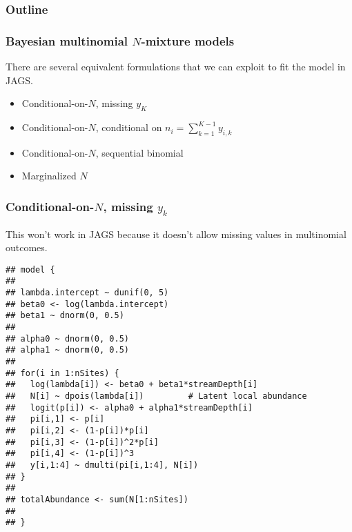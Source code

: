 \documentclass[color=usenames,dvipsnames]{beamer}\usepackage[]{graphicx}\usepackage[]{color}
\makeatletter
\newenvironment{kframe}{%
 \def\at@end@of@kframe{}%
 \ifinner\ifhmode%
  \def\at@end@of@kframe{\end{minipage}}%
  \begin{minipage}{\columnwidth}%
 \fi\fi%
 \def\FrameCommand##1{\hskip\@totalleftmargin \hskip-\fboxsep
 \colorbox{shadecolor}{##1}\hskip-\fboxsep
     \hskip-\linewidth \hskip-\@totalleftmargin \hskip\columnwidth}%
 \MakeFramed {\advance\hsize-\width
   \@totalleftmargin\z@ \linewidth\hsize
   \@setminipage}}%
 {\par\unskip\endMakeFramed%
 \at@end@of@kframe}
\newenvironment{knitrout}{}{} %
\makeatother
\begin{document}
\begin{frame}
  \frametitle{Outline}
  \Large
\end{frame}


\begin{frame}
  \frametitle{Bayesian multinomial $N$-mixture models}
  There are several equivalent formulations that we can
  exploit to fit the model in JAGS.
  \begin{itemize}
    \item Conditional-on-$N$, missing $y_K$
    \item Conditional-on-$N$, conditional on $n_i=\sum_{k=1}^{K-1} y_{i,k}$
    \item Conditional-on-$N$, sequential binomial
    \item Marginalized $N$
  \end{itemize}
  
\end{frame}



\begin{frame}[fragile]
  \frametitle{Conditional-on-$N$, missing $y_k$}
  \small
  This won't work in JAGS because it doesn't allow missing values in
  multinomial outcomes.
\begin{knitrout}\scriptsize
{}\color{fgcolor}\begin{kframe}
\begin{verbatim}
## model {
## 
## lambda.intercept ~ dunif(0, 5)
## beta0 <- log(lambda.intercept)
## beta1 ~ dnorm(0, 0.5)
## 
## alpha0 ~ dnorm(0, 0.5)  
## alpha1 ~ dnorm(0, 0.5)
## 
## for(i in 1:nSites) {
##   log(lambda[i]) <- beta0 + beta1*streamDepth[i]
##   N[i] ~ dpois(lambda[i])         # Latent local abundance
##   logit(p[i]) <- alpha0 + alpha1*streamDepth[i]
##   pi[i,1] <- p[i]
##   pi[i,2] <- (1-p[i])*p[i]
##   pi[i,3] <- (1-p[i])^2*p[i]
##   pi[i,4] <- (1-p[i])^3
##   y[i,1:4] ~ dmulti(pi[i,1:4], N[i])
## }
## 
## totalAbundance <- sum(N[1:nSites])
## 
## }
\end{verbatim}
\end{kframe}
\end{knitrout}

\end{frame}
\end{document}
